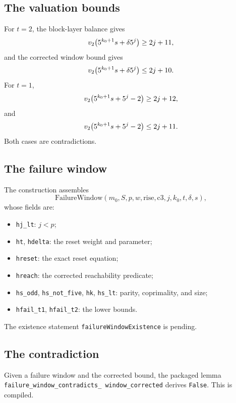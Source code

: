 \subsection{The valuation bounds}

For $t=2$, the block-layer balance gives
\begin{equation*}
  v_2\!\left(5^{k_0+1}s+\delta5^j\right)\ge2j+11,
\end{equation*}
and the corrected window bound gives
\begin{equation*}
  v_2\!\left(5^{k_0+1}s+\delta5^j\right)\le2j+10.
\end{equation*}
For $t=1$,
\begin{equation*}
  v_2\!\left(5^{k_0+1}s+5^j-2\right)\ge2j+12,
\end{equation*}
and
\begin{equation*}
  v_2\!\left(5^{k_0+1}s+5^j-2\right)\le2j+11.
\end{equation*}
Both cases are contradictions.

\subsection{The failure window}

The construction assembles
\begin{equation*}
  \mathrm{FailureWindow}(m_0,S,p,w,\mathrm{rise},\mathrm{c3},
  j,k_0,t,\delta,s),
\end{equation*}
whose fields are:
\begin{itemize}[leftmargin=*]
\item \texttt{hj\_lt}: $j<p$;
\item \texttt{ht}, \texttt{hdelta}: the reset weight and parameter;
\item \texttt{hreset}: the exact reset equation;
\item \texttt{hreach}: the corrected reachability predicate;
\item \texttt{hs\_odd}, \texttt{hs\_not\_five}, \texttt{hk},
  \texttt{hs\_lt}: parity, coprimality, and size;
\item \texttt{hfail\_t1}, \texttt{hfail\_t2}: the lower bounds.
\end{itemize}
The existence statement
\texttt{failureWindowExistence} is pending.

\subsection{The contradiction}

Given a failure window and the corrected bound, the packaged lemma
\texttt{failure\_\allowbreak window\_\allowbreak contradicts\_\allowbreak
window\_\allowbreak corrected} derives \texttt{False}.  This is
compiled.

